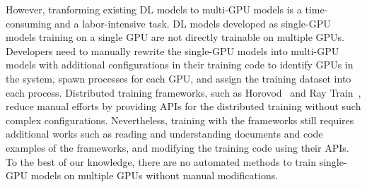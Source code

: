 However, tranforming existing DL models to multi-GPU models is a time-consuming
and a labor-intensive task.
DL models developed as single-GPU models training on a single GPU are not
directly trainable on multiple GPUs. 
Developers need to manually rewrite the single-GPU models into multi-GPU models
with additional configurations in their training code to identify GPUs in the
system, spawn processes for each GPU, and assign the training dataset into each
process.
Distributed training frameworks, such as Horovod~\cite{sergeev2018horovod} and
Ray Train~\cite{raytrain}, reduce manual efforts by providing APIs for the
distributed training without such complex configurations.
Nevertheless, training with the frameworks still requires additional works such
as reading and understanding documents and code examples of the frameworks, and
modifying the training code using their APIs.
To the best of our knowledge, there are no automated methods to train
single-GPU models on multiple GPUs without manual modifications.




